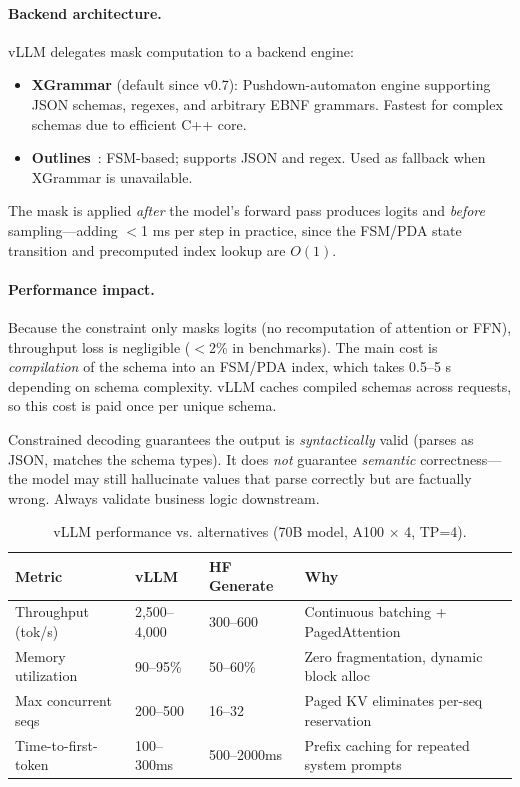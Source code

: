 \paragraph{Backend architecture.}
\label{backend-architecture.}

vLLM delegates mask computation to a backend engine:

\begin{itemize}
  \item \textbf{XGrammar} (default since v0.7): Pushdown-automaton engine supporting JSON schemas, regexes, and arbitrary EBNF grammars. Fastest for complex schemas due to efficient C++ core.
  \item \textbf{Outlines}~\cite{willard2023outlines}: FSM-based; supports JSON and regex. Used as fallback when XGrammar is unavailable.
\end{itemize}

The mask is applied \emph{after} the model’s forward pass produces logits and \emph{before} sampling---adding $<$1 ms per step in practice, since the FSM/PDA state transition and precomputed index lookup are $O(1)$.

\paragraph{Performance impact.}
\label{performance-impact.}

Because the constraint only masks logits (no recomputation of attention or FFN), throughput loss is negligible ($<$2\% in benchmarks). The main cost is \emph{compilation} of the schema into an FSM/PDA index, which takes 0.5--5 s depending on schema complexity. vLLM caches compiled schemas across requests, so this cost is paid once per unique schema.

\begin{warningbox}
Constrained decoding guarantees the output is \emph{syntactically} valid (parses as JSON, matches the schema types). It does \emph{not} guarantee \emph{semantic} correctness---the model may still hallucinate values that parse correctly but are factually wrong. Always validate business logic downstream.
\end{warningbox}

\begin{table}[ht!]
\centering
\caption{vLLM performance vs. alternatives (70B model, A100 $\times$ 4, TP=4).}
\begin{tabular}{@{}lp{3.5cm}p{3.5cm}p{6cm}@{}}
\toprule
\textbf{Metric} & \textbf{vLLM} & \textbf{HF Generate} & \textbf{Why} \\
\midrule
Throughput (tok/s) & 2,500--4,000 & 300--600 & Continuous batching + PagedAttention \\
Memory utilization & 90--95\% & 50--60\% & Zero fragmentation, dynamic block alloc \\
Max concurrent seqs & 200--500 & 16--32 & Paged KV eliminates per-seq reservation \\
Time-to-first-token & 100--300ms & 500--2000ms & Prefix caching for repeated system prompts \\
\bottomrule
\end{tabular}
\end{table}

